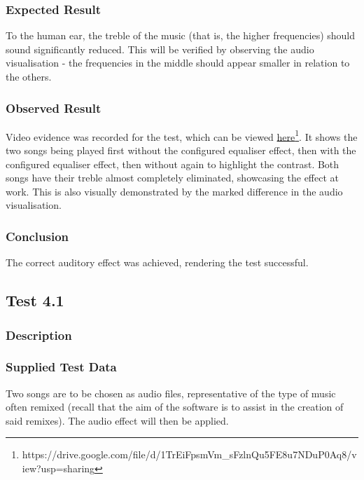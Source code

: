 \subsubsection*{Expected Result}
To the human ear, the treble of the music (that is, the higher frequencies) should sound significantly reduced. This will be verified by observing the audio visualisation - the frequencies in the middle should appear smaller in relation to the others.

\subsubsection*{Observed Result}
\label{sec:evidence3.2}
Video evidence was recorded for the test, which can be viewed \href{https://drive.google.com/file/d/1TrEiFpsmVm_sFzlnQu5FE8u7NDuP0Aq8/view?usp=sharing}{here}\footnote{
	https://drive.google.com/file/d/1TrEiFpsmVm\_sFzlnQu5FE8u7NDuP0Aq8/view?usp=sharing
}. It shows the two songs being played first without the configured equaliser effect, then with the configured equaliser effect, then without again to highlight the contrast. Both songs have their treble almost completely eliminated, showcasing the effect at work. This is also visually demonstrated by the marked difference in the audio visualisation.

\subsubsection*{Conclusion}
The correct auditory effect was achieved, rendering the test successful.


\pagebreak
\subsection{Test 4.1}
\subsubsection*{Description}
\paragraph{}
{
	\centering
}

\subsubsection*{Supplied Test Data}
Two songs are to be chosen as audio files, representative of the type of music often remixed (recall that the aim of the software is to assist in the creation of said remixes). The audio effect will then be applied.

